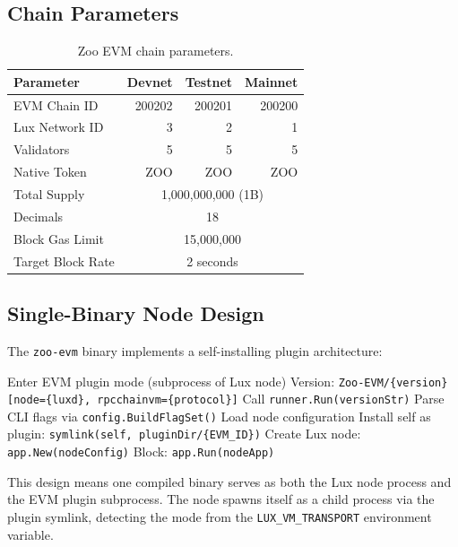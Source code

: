 \documentclass[11pt,a4paper]{article}
\begin{document}
\subsection{Chain Parameters}

\begin{table}[h]
\centering
\begin{tabular}{lrrr}
\toprule
\textbf{Parameter} & \textbf{Devnet} & \textbf{Testnet} & \textbf{Mainnet} \\
\midrule
EVM Chain ID & 200202 & 200201 & 200200 \\
Lux Network ID & 3 & 2 & 1 \\
Validators & 5 & 5 & 5 \\
Native Token & ZOO & ZOO & ZOO \\
Total Supply & \multicolumn{3}{c}{1,000,000,000 (1B)} \\
Decimals & \multicolumn{3}{c}{18} \\
Block Gas Limit & \multicolumn{3}{c}{15,000,000} \\
Target Block Rate & \multicolumn{3}{c}{2 seconds} \\
\bottomrule
\end{tabular}
\caption{Zoo EVM chain parameters.}
\end{table}

\subsection{Single-Binary Node Design}

The \texttt{zoo-evm} binary implements a self-installing plugin architecture:

\begin{algorithm}
\caption{Zoo EVM Self-Installing Plugin}
\begin{algorithmic}[1]
  \STATE Enter EVM plugin mode (subprocess of Lux node)
  \STATE Version: \texttt{Zoo-EVM/\{version\} [node=\{luxd\}, rpcchainvm=\{protocol\}]}
  \STATE Call \texttt{runner.Run(versionStr)}
\ELSE
  \STATE Parse CLI flags via \texttt{config.BuildFlagSet()}
  \STATE Load node configuration
  \STATE Install self as plugin: \texttt{symlink(self, pluginDir/\{EVM\_ID\})}
  \STATE Create Lux node: \texttt{app.New(nodeConfig)}
  \STATE Block: \texttt{app.Run(nodeApp)}
\ENDIF
\end{algorithmic}
\end{algorithm}

This design means one compiled binary serves as both the Lux node process and the EVM plugin subprocess. The node spawns itself as a child process via the plugin symlink, detecting the mode from the \texttt{LUX\_VM\_TRANSPORT} environment variable.
\end{document}
